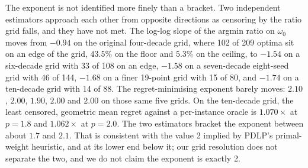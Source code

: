 The exponent is not identified more finely than a bracket. Two independent
estimators approach each other from opposite directions as censoring by the
ratio grid falls, and they have not met. The log-log slope of the argmin ratio
on $\omega_0$ moves from $-0.94$ on the original four-decade grid, where 102 of
209 optima sit on an edge of the grid, $43.5\%$ on the floor and $5.3\%$ on the
ceiling, to $-1.54$ on a six-decade grid with 33 of 108 on an edge, $-1.58$ on
a seven-decade eight-seed grid with 46 of 144, $-1.68$ on a finer 19-point grid
with 15 of 80, and $-1.74$ on a ten-decade grid with 14 of 88. The
regret-minimising exponent barely moves: $2.10$, $2.00$, $1.90$, $2.00$ and
$2.00$ on those same five grids. On the ten-decade grid, the least censored,
geometric mean regret against a per-instance oracle is $1.070\times$ at $p=1.8$
and $1.062\times$ at $p=2.0$. The two estimators bracket the exponent between
about $1.7$ and $2.1$. That is consistent with the value 2 implied by PDLP's
primal-weight heuristic, and at its lower end below it; our grid resolution
does not separate the two, and we do not claim the exponent is exactly 2.

